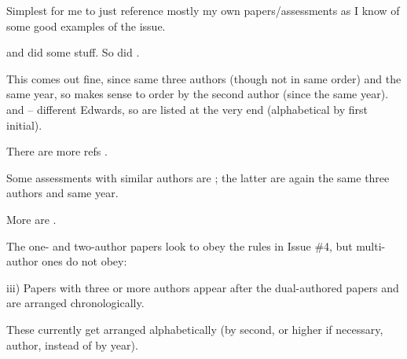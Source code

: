 \documentclass[11pt]{book}
\newcommand{\fishname}{Pacific Ocean Perch}
\begin{document}

Simplest for me to just reference mostly my own papers/assessments as I know of
some good examples of the issue.

\citet{eb96} and \citet{eb99} did some stuff. So did \citet{eb01}. 

This comes out fine, since same three authors (though not in same order) 
and the same year, so makes sense to order by the second author (since the same 
year).
\citet{ebp00} and \citet{epb00} -- different Edwards, so are listed at the very 
end (alphabetical by first initial).

There are more refs \citep{edwa01, edwa08, efbj12}.

Some assessments with similar authors are 
\citet{ehs12, ehs14area5DE, ehs14area3CD}; the latter are again the same three 
authors and same year.

More are \citet{ehs15, epw01, esh12, erpbb17}.

The one- and two-author papers look to obey the rules in Issue \#4, but 
multi-author ones do not obey:

iii) Papers with three or more authors appear after the dual-authored papers 
and are arranged chronologically. 

These currently get arranged alphabetically (by second, or higher if necessary, 
author, instead of by year).

\clearpage



\end{document}
